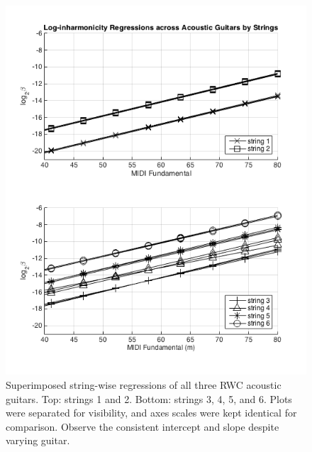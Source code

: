 \documentclass[12pt]{cmuthesis}
\begin{document}
\begin{figure}[!htbp] 
\label{fig:traj-compare-ag}
\centering
\includegraphics[scale=0.75]{traj-compare-ag}
\caption{Superimposed string-wise regressions of all three RWC acoustic guitars. Top: strings 1 and 2. Bottom: strings 3, 4, 5, and 6. Plots were separated for visibility, and axes scales were kept identical for comparison. Observe the consistent intercept and slope despite varying guitar.}
\end{figure}
\end{document}
